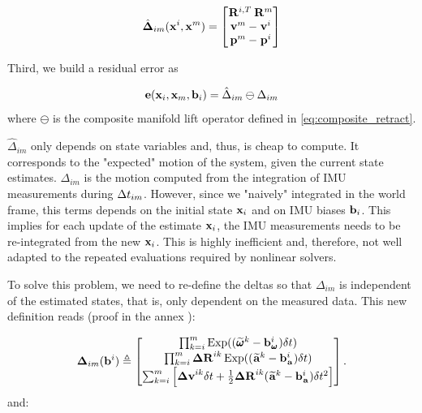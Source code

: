 \begin{align}
    \hat{{\bm \Delta}}_{im}({\bf x}^i, {\bf x}^m) = 
    \begin{bmatrix}
    \prescript{}{}{{\bf R}}_{}^{i,T} \prescript{}{}{{\bf R}}_{}^{m}  \\
    \prescript{}{}{{\bf v}}_{}^{m}  - \prescript{}{}{{\bf v}}_{}^{i}  \\
    \prescript{}{}{{\bf p}}_{}^{m} - \prescript{}{}{{\bf p}}_{}^{i}
    \end{bmatrix}
\end{align}

Third, we build a residual error as

\begin{equation}
    {\bf e}({\bf x}_i, {\bf x}_m, {\bf b}_i) = \hat\Delta_{im} \ominus \Delta_{im}
    \label{eq:error_naive_preintegration}
\end{equation}
%
where $\ominus$ is the composite manifold lift operator defined in \ref{eq:composite_retract}.

$\hat\Delta_{im}$ only depends on state variables and, thus, is cheap to compute. It corresponds to the "expected" motion of the system, given the current state estimates. 
$\Delta_{im}$ is the motion computed from the integration of IMU measurements during $\Delta t_{im}$. However, since we "naively" integrated
in the world frame, this terms depends on the initial state ${\bf x}_i$ and on IMU biases ${\bf b}_i$. This implies for each update of the estimate ${\bf x}_i$, the IMU measurements needs to be re-integrated from the new ${\bf x}_i$. This is highly inefficient and, therefore, not well adapted to the repeated evaluations required by nonlinear solvers.

To solve this problem, we need to re-define the deltas so that $\Delta_{im}$ is independent of the estimated states, that is, only dependent on the measured data. This new definition reads \cite{lupton-09, forster2015imu} (proof in the annex ):

\begin{align}
    {\bm \Delta}_{im}({\bf b}^i) \triangleq 
    \begin{bmatrix}
    \prod_{k=i}^{m} \operatorname*{Exp}((\prescript{}{}{\widetilde{\pmb{\omega}}}_{}^k - {\bf b}_{\prescript{}{}{\pmb{\omega}}_{}}^i)\delta t)  \\
    \prod_{k=i}^{m} {\bm \Delta {\bf R}}^{ik} \operatorname*{Exp}((\prescript{}{}{\widetilde{{\bf a}}}_{}^k - {\bf b}_{\prescript{}{}{{\bf a}}_{}}^i)\delta t)  \\
    \sum_{k=i}^{m} \Big[{\bm \Delta {\bf v}}^{ik}\delta t +  \frac{1}{2} {\bm \Delta {\bf R}}^{ik} (\prescript{}{}{\widetilde{{\bf a}}}_{}^k - {\bf b}_{\prescript{}{}{{\bf a}}_{}}^i)\delta t^2 \Big]
    \end{bmatrix}.
    \label{eq:imu_delta}
\end{align}
%
and:

